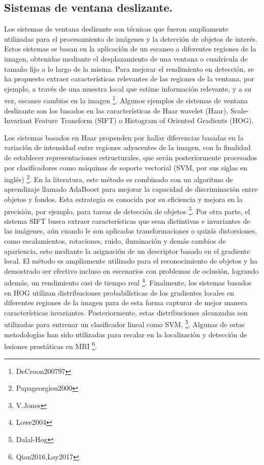 \subsection{Sistemas de ventana deslizante. }%
Los sistemas de ventana deslizante son técnicas que fueron ampliamente utilizadas para el procesamiento de imágenes y la detección de objetos de interés. Estos sistemas se basan en la aplicación de un escaneo a diferentes regiones de la imagen, obtenidas mediante el desplazamiento de una ventana o cuadrícula de tamaño fijo a lo largo de la misma. Para mejorar el rendimiento en detección, se ha propuesto extraer características relevantes de las regiones de la ventana, por ejemplo, a través de una muestra local que estime información relevante, y a su vez, escanee cambios en la imagen \footnote{DeCroon200797}. Algunos ejemplos de sistemas de ventana deslizante son los basados en las características de Haar wavelet (Haar), Scale-Invariant Feature Transform (SIFT) o Histogram of Oriented Gradients (HOG).\par
Los sistemas basados en Haar propenden por hallar diferencias basadas en la variación de intensidad entre regiones adyacentes de la imagen, con la finalidad de establecer representaciones estructurales, que serán posteriormente procesados por clasificadores como máquinas de soporte vectorial (SVM, por sus siglas en inglés) \footnote{Papageorgiou2000}. En la literatura, este método es combinado con un algoritmo de aprendizaje llamado AdaBoost para mejorar la capacidad de discriminación entre objetos y fondos. Esta estrategia es conocida por su eficiencia y mejora en la precisión, por ejemplo, para tareas de detección de objetos \footnote{V.Jones}. Por otra parte, el sistema SIFT busca extraer características que sean distintivas e invariantes de las imágenes, aún cuando le son aplicadas transformaciones o quizás distorsiones, como escalamientos, rotaciones, ruido, iluminación y demás cambios de apariencia, esto mediante la asignación de un descriptor basado en el gradiente local. El método es ampliamente utilizado para el reconocimiento de objetos y ha demostrado ser efectivo incluso en escenarios con problemas de oclusión, logrando además, un rendimiento casi de tiempo real \footnote{Lowe2004}. Finalmente, los sistemas basados en HOG utilizan distribuciones probabilísticas de los gradientes locales en diferentes regiones de la imagen para de esta forma capturar de mejor manera características invariantes. Posteriormente, estas distribuciones alcanzadas son utilizadas para entrenar un clasificador lineal como SVM. \footnote{Dalal-Hog}. Algunas de estas metodologías han sido utilizadas para recalar en la localización y detección de lesiones prostáticas en MRI \footnote{Qian2016,Lay2017}.

